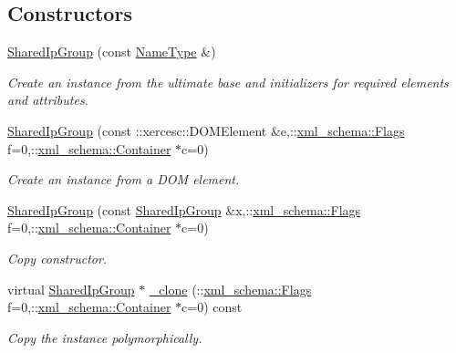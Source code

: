 \subsection*{Constructors}
\begin{DoxyCompactItemize}
\item 
\hypertarget{classopenstack_1_1xml_1_1SharedIpGroup_a939e4d915edac2046233caabf5094f60}{
\hyperlink{classopenstack_1_1xml_1_1SharedIpGroup_a939e4d915edac2046233caabf5094f60}{SharedIpGroup} (const \hyperlink{classopenstack_1_1xml_1_1SharedIpGroup_a412e927c31c4fe2246f4d8b51a06e7f9}{NameType} \&)}
\label{classopenstack_1_1xml_1_1SharedIpGroup_a939e4d915edac2046233caabf5094f60}

\begin{DoxyCompactList}\small\item\em Create an instance from the ultimate base and initializers for required elements and attributes. \item\end{DoxyCompactList}\item 
\hyperlink{classopenstack_1_1xml_1_1SharedIpGroup_aadde9e127957d369451bd1b222f6b7e0}{SharedIpGroup} (const ::xercesc::DOMElement \&e,::\hyperlink{namespacexml__schema_affb4c227cbd9aa7453dd1dc5a1401943}{xml\_\-schema::Flags} f=0,::\hyperlink{namespacexml__schema_a333dea2213742aea47a37532dec4ec27}{xml\_\-schema::Container} $\ast$c=0)
\begin{DoxyCompactList}\small\item\em Create an instance from a DOM element. \item\end{DoxyCompactList}\item 
\hyperlink{classopenstack_1_1xml_1_1SharedIpGroup_ab1034ea078185339a6c62f3a7f25d711}{SharedIpGroup} (const \hyperlink{classopenstack_1_1xml_1_1SharedIpGroup}{SharedIpGroup} \&x,::\hyperlink{namespacexml__schema_affb4c227cbd9aa7453dd1dc5a1401943}{xml\_\-schema::Flags} f=0,::\hyperlink{namespacexml__schema_a333dea2213742aea47a37532dec4ec27}{xml\_\-schema::Container} $\ast$c=0)
\begin{DoxyCompactList}\small\item\em Copy constructor. \item\end{DoxyCompactList}\item 
virtual \hyperlink{classopenstack_1_1xml_1_1SharedIpGroup}{SharedIpGroup} $\ast$ \hyperlink{classopenstack_1_1xml_1_1SharedIpGroup_a2069bec165f442823f52254598f50009}{\_\-clone} (::\hyperlink{namespacexml__schema_affb4c227cbd9aa7453dd1dc5a1401943}{xml\_\-schema::Flags} f=0,::\hyperlink{namespacexml__schema_a333dea2213742aea47a37532dec4ec27}{xml\_\-schema::Container} $\ast$c=0) const 
\begin{DoxyCompactList}\small\item\em Copy the instance polymorphically. \item\end{DoxyCompactList}\end{DoxyCompactItemize}


